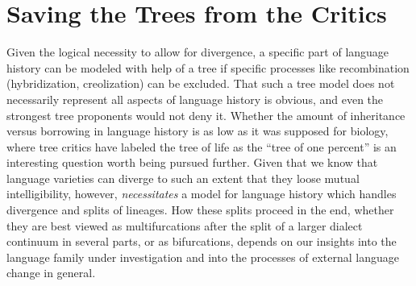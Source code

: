 \documentclass[svgnames,12pt]{scrartcl}
\begin{document}
{{\section{Saving the Trees from the Critics}
Given the logical necessity to allow for divergence, a specific part of language history can be
modeled with help of a tree if specific processes like recombination (hybridization, creolization)
can be excluded. That such a tree model does not necessarily represent all aspects of language
history is obvious, and even the strongest tree proponents would not deny it. Whether the amount
of inheritance versus borrowing in language history is as low as it was supposed for biology, where
tree critics have labeled the tree of life as the ``tree of one percent'' \citep{Dagan2006} is an
interesting question worth being pursued further. Given that we know that language varieties can
diverge to such an extent that they loose mutual intelligibility, however, \emph{necessitates} a model for
language history which handles divergence and splits of lineages. How these splits proceed in the
end, whether they are best viewed as multifurcations after the split of a larger dialect continuum
in several parts, or as bifurcations, depends on our insights into the language family under
investigation and into the processes of external language change in general.  
 
}}
\end{document}
